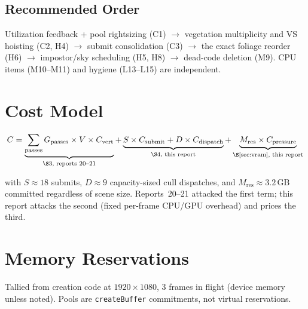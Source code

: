 \documentclass[11pt,a4paper]{article}
\begin{document}
\subsection{Recommended Order}

Utilization feedback + pool rightsizing (C1) $\rightarrow$ vegetation
multiplicity and VS hoisting (C2, H4) $\rightarrow$ submit consolidation
(C3) $\rightarrow$ the exact foliage reorder (H6) $\rightarrow$ impostor/sky
scheduling (H5, H8) $\rightarrow$ dead-code deletion (M9). CPU items
(M10--M11) and hygiene (L13--L15) are independent.

\section{Cost Model}

\begin{equation}
C = \underbrace{\sum_{\mathrm{passes}} G_{\mathrm{passes}} \times V \times C_{\mathrm{vert}}}_{\text{\S3, reports 20--21}} + \underbrace{S \times C_{\mathrm{submit}} + D \times C_{\mathrm{dispatch}}}_{\text{\S4, this report}} + \underbrace{M_{\mathrm{res}} \times C_{\mathrm{pressure}}}_{\text{\S\ref{sec:vram}, this report}}
\end{equation}

with $S \approx 18$ submits, $D \approx 9$ capacity-sized cull dispatches,
and $M_{\mathrm{res}} \approx 3.2$\,GB committed regardless of scene size.
Reports~20--21 attacked the first term; this report attacks the second
(fixed per-frame CPU/GPU overhead) and prices the third.

\section{Memory Reservations}
\label{sec:vram}

Tallied from creation code at $1920\times1080$, 3 frames in flight (device
memory unless noted). Pools are \texttt{createBuffer} commitments, not
virtual reservations.
\end{document}
